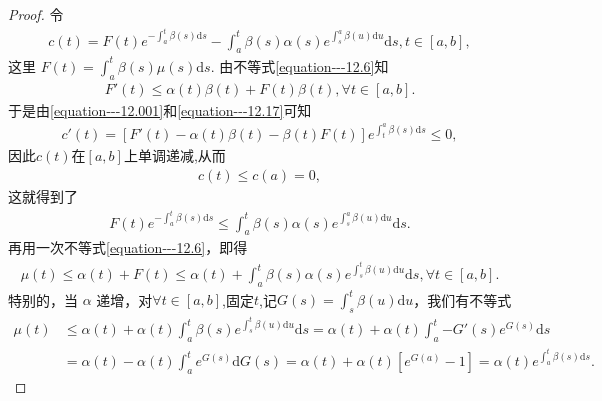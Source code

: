 \documentclass[../../main.tex]{subfiles}%
\begin{document}
\begin{proof}
令
\begin{align}
c(t)=F(t)e^{-\int_{a}^{t}\beta(s)\mathrm{d}s}-\int_{a}^{t}\beta(s)\alpha(s)e^{\int_{s}^{a}\beta(u)\mathrm{d}u}\mathrm{d}s,t\in[a,b],\label{equation---12.001}
\end{align}
这里 $F(t)=\int_{a}^{t}\beta(s)\mu(s)\mathrm{d}s$. 由不等式\eqref{equation---12.6}知
\begin{align}
F'(t)\leqslant\alpha(t)\beta(t)+F(t)\beta(t),\forall t\in[a,b].\label{equation---12.17}
\end{align}
于是由\eqref{equation---12.001}和\eqref{equation---12.17}可知
\begin{align*}
c'(t)=[F'(t)-\alpha(t)\beta(t)-\beta(t)F(t)]e^{\int_{t}^{a}\beta(s)\mathrm{d}s}\leqslant0,
\end{align*}
因此$c(t)$在$[a,b]$上单调递减,从而
\begin{align*}
c(t)\leqslant c(a)=0,
\end{align*}
这就得到了
\begin{align*}
F(t)e^{-\int_{a}^{t}\beta(s)\mathrm{d}s}\leqslant\int_{a}^{t}\beta(s)\alpha(s)e^{\int_{s}^{a}\beta(u)\mathrm{d}u}\mathrm{d}s.
\end{align*}
再用一次不等式\eqref{equation---12.6}，即得
\begin{align*}
\mu(t)\leqslant\alpha(t)+F(t)\leqslant\alpha(t)+\int_{a}^{t}\beta(s)\alpha(s)e^{\int_{s}^{t}\beta(u)\mathrm{d}u}\mathrm{d}s,\forall t\in[a,b].
\end{align*}
特别的，当 $\alpha$ 递增，对$\forall t\in [a,b]$,固定$t$,记$G(s)=\int_s^t{\beta (u)\mathrm{d}u}$，我们有不等式
\begin{align*}
\mu (t)&\leqslant \alpha (t)+\alpha (t)\int_a^t{\beta (s)e^{\int_s^t{\beta (u)\mathrm{d}u}}\mathrm{d}s}=\alpha (t)+\alpha (t)\int_a^t{-G' \left( s \right) e^{G\left( s \right)}\mathrm{d}s}
\\
&=\alpha (t)-\alpha (t)\int_a^t{e^{G\left( s \right)}\mathrm{d}G\left( s \right)}=\alpha (t)+\alpha (t)\left[ e^{G\left( a \right)}-1 \right] =\alpha (t)e^{\int_a^t{\beta (s)\mathrm{d}s}}.
\end{align*} 
\end{proof}
\end{document}
